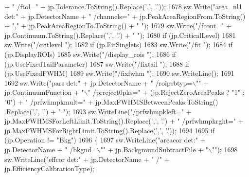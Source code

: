 \begin{DoxyCode}
      + \textcolor{stringliteral}{" /ftol="} + jp.Tolerance.ToString().Replace(\textcolor{charliteral}{','}, \textcolor{charliteral}{'.'}));
1678             sw.Write(\textcolor{stringliteral}{"area\_nl1 det:"} + jp.DetectorName + \textcolor{stringliteral}{" /channels="} + jp.PeakAreaRegionFrom.ToString() +
       \textcolor{stringliteral}{","} + jp.PeakAreaRegionTo.ToString() + \textcolor{stringliteral}{" "});
1679             sw.Write(\textcolor{stringliteral}{"/fcont="} + jp.Continuum.ToString().Replace(\textcolor{charliteral}{','}, \textcolor{charliteral}{'.'}) + \textcolor{stringliteral}{" "});
1680             \textcolor{keywordflow}{if} (jp.CriticalLevel)
1681                 sw.Write(\textcolor{stringliteral}{"/critlevel "});
1682             \textcolor{keywordflow}{if} (jp.FitSinglets)
1683                 sw.Write(\textcolor{stringliteral}{"/fit "});
1684             \textcolor{keywordflow}{if} (jp.DisplayROIs)
1685                 sw.Write(\textcolor{stringliteral}{"/display\_rois "});
1686             \textcolor{keywordflow}{if} (jp.UseFixedTailParameter)
1687                 sw.Write(\textcolor{stringliteral}{"/fixtail "});
1688             \textcolor{keywordflow}{if} (jp.UseFixedFWHM)
1689                 sw.Write(\textcolor{stringliteral}{"/fixfwhm "});
1690             sw.WriteLine();
1691 
1692             sw.Write(\textcolor{stringliteral}{"pars det:"} + jp.DetectorName + \textcolor{stringliteral}{" /roipsbtyp=\(\backslash\)""} + jp.ContinuumFunction + \textcolor{stringliteral}{"\(\backslash\)"
       /prreject0pks="} + (jp.RejectZeroAreaPeaks ? \textcolor{stringliteral}{"1"} : \textcolor{stringliteral}{"0"}) + \textcolor{stringliteral}{" /prfwhmpkmult="} + jp.MaxFWHMSBetweenPeaks.ToString()
      .Replace(\textcolor{charliteral}{','}, \textcolor{charliteral}{'.'}) + \textcolor{stringliteral}{" "});
1693             sw.WriteLine(\textcolor{stringliteral}{"/prfwhmpkleft="} + jp.MaxFWHMSForLeftLimit.ToString().Replace(\textcolor{charliteral}{','}, \textcolor{charliteral}{'.'}) + \textcolor{stringliteral}{"
       /prfwhmpkrght="} + jp.MaxFWHMSForRightLimit.ToString().Replace(\textcolor{charliteral}{','}, \textcolor{charliteral}{'.'}));
1694 
1695             \textcolor{keywordflow}{if} (jp.Operation != \textcolor{stringliteral}{"Bkg"})
1696             \{
1697                 sw.WriteLine(\textcolor{stringliteral}{"areacor det:"} + jp.DetectorName + \textcolor{stringliteral}{" /bkgnd=\(\backslash\)""} + jp.BackgroundSubtractFile + \textcolor{stringliteral}{
      "\(\backslash\)""});
1698                 sw.WriteLine(\textcolor{stringliteral}{"effcor det:"} + jp.DetectorName + \textcolor{stringliteral}{" /"} + jp.EfficiencyCalibrationType);

\end{DoxyCode}
